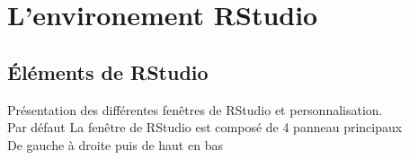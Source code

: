\section{L'environement RStudio}
%

\subsection{Éléments de RStudio}
Présentation des différentes fenêtres de RStudio et personnalisation.\\
Par défaut La fenêtre de RStudio est composé de 4 panneau principaux\\
De gauche à droite puis de haut en bas\\





